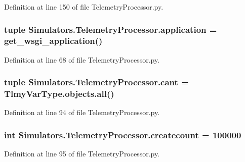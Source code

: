 Definition at line 150 of file Telemetry\+Processor.\+py.

\hypertarget{namespace_simulators_1_1_telemetry_processor_a5febb933bf5e066cf21cae50f488f344}{}
\subsubsection[{application}]{\setlength{\rightskip}{0pt plus 5cm}tuple Simulators.\+Telemetry\+Processor.\+application = get\+\_\+wsgi\+\_\+application()}\label{namespace_simulators_1_1_telemetry_processor_a5febb933bf5e066cf21cae50f488f344}


Definition at line 68 of file Telemetry\+Processor.\+py.

\hypertarget{namespace_simulators_1_1_telemetry_processor_abc826fa3560eab24e061626347bca797}{}
\subsubsection[{cant}]{\setlength{\rightskip}{0pt plus 5cm}tuple Simulators.\+Telemetry\+Processor.\+cant = Tlmy\+Var\+Type.\+objects.\+all()}\label{namespace_simulators_1_1_telemetry_processor_abc826fa3560eab24e061626347bca797}


Definition at line 94 of file Telemetry\+Processor.\+py.

\hypertarget{namespace_simulators_1_1_telemetry_processor_a4c9006577ee9d8c413d6101dff7d6f4a}{}
\subsubsection[{createcount}]{\setlength{\rightskip}{0pt plus 5cm}int Simulators.\+Telemetry\+Processor.\+createcount = 100000}\label{namespace_simulators_1_1_telemetry_processor_a4c9006577ee9d8c413d6101dff7d6f4a}


Definition at line 95 of file Telemetry\+Processor.\+py.

\hypertarget{namespace_simulators_1_1_telemetry_processor_a937de4fb49355315e9cf23ca29d51a3a}{}
